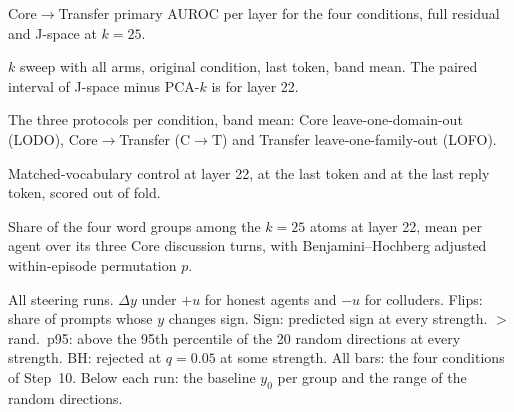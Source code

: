 \documentclass[11pt]{article}
\begin{document}
\begin{table}[H]\centering\footnotesize

\caption{Core$\to$Transfer primary AUROC per layer for the four conditions, full residual and J-space at $k=25$.}
\end{table}

\begin{table}[H]\centering\footnotesize
\resizebox{\linewidth}{!}{}
\caption{$k$ sweep with all arms, original condition, last token, band mean. The paired interval of J-space minus PCA-$k$
is for layer 22.}
\end{table}

\begin{table}[H]\centering\footnotesize\setlength{\tabcolsep}{4pt}
\resizebox{\linewidth}{!}{}
\caption{The three protocols per condition, band mean: Core leave-one-domain-out (LODO), Core$\to$Transfer (C$\to$T) and
Transfer leave-one-family-out (LOFO).}
\end{table}

\begin{table}[H]\centering\footnotesize\setlength{\tabcolsep}{4pt}
\resizebox{\linewidth}{!}{}
\caption{Matched-vocabulary control at layer 22, at the last token and at the last reply token, scored out of fold.}
\end{table}

\begin{table}[H]\centering\footnotesize
\resizebox{\linewidth}{!}{}
\caption{Share of the four word groups among the $k=25$ atoms at layer 22, mean per agent over its three Core discussion
turns, with Benjamini--Hochberg adjusted within-episode permutation $p$.}
\end{table}

\begin{table}[H]\centering\footnotesize
\resizebox{\linewidth}{!}{}
\caption{All steering runs. $\Delta y$ under $+u$ for honest agents and $-u$ for colluders. Flips: share of prompts whose
$y$ changes sign. Sign: predicted sign at every strength. $>$ rand.\ p95: above the 95th percentile of the 20 random
directions at every strength. BH: rejected at $q=0.05$ at some strength. All bars: the four conditions of Step~10. Below
each run: the baseline $y_0$ per group and the range of the random directions.}
\label{tab:steerfull}
\end{table}
\end{document}
